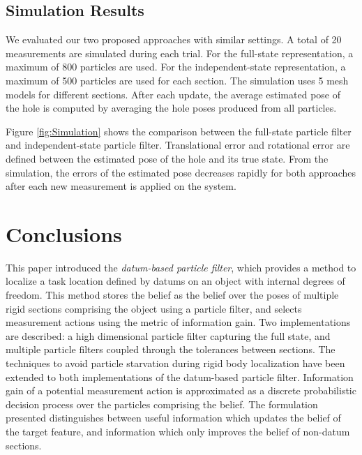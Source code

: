 \documentclass[letterpaper, 10 pt, conference]{ieeeconf}
\begin{document}
\subsection{Simulation Results}

We evaluated our two proposed approaches with similar settings. 
A total of 20 measurements are simulated during each trial. 
For the full-state representation, a maximum of 800 particles are used. For the independent-state representation, a maximum of 500 particles are used for each section.
The simulation uses 5 mesh models for different sections. 
After each update, the average estimated pose of the hole is computed by averaging the hole poses produced from all particles. 

Figure \ref{fig:Simulation} shows the comparison between the full-state particle filter and independent-state particle filter. 
Translational error and rotational error are defined between the estimated pose of the hole and its true state. 
From the simulation, the errors of the estimated pose decreases rapidly for both approaches after each new measurement is applied on the system. 

\section{Conclusions}

This paper introduced the \textit{datum-based particle filter}, which provides a method to localize a task location defined by datums on an object with internal degrees of freedom.
This method stores the belief as the belief over the poses of multiple rigid sections comprising the object using a particle filter, and selects measurement actions using the metric of information gain.
Two implementations are described: a high dimensional particle filter capturing the full state, and multiple particle filters coupled through the tolerances between sections.
The techniques to avoid particle starvation during rigid body localization have been extended to both implementations of the datum-based particle filter. 
Information gain of a potential measurement action is approximated as a discrete probabilistic decision process over the particles comprising the belief.
The formulation presented distinguishes between useful information which updates the belief of the target feature, and information which only improves the belief of non-datum sections.
\end{document}
